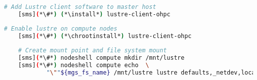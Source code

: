 
\begin{lstlisting}[language=bash,keywords={},upquote=true]
    # Add Lustre client software to master host
    [sms](*\#*) (*\install*) lustre-client-ohpc
    \end{lstlisting}
    
    \begin{lstlisting}[language=bash,keywords={},upquote=true]
    # Enable lustre on compute nodes
    [sms](*\#*) (*\chrootinstall*) lustre-client-ohpc
    
    # Create mount point and file system mount
    [sms](*\#*) nodeshell compute mkdir /mnt/lustre
    [sms](*\#*) nodeshell compute echo  \
            "\""${mgs_fs_name} /mnt/lustre lustre defaults,_netdev,localflock,retry=2 0 0"\"" \>\> /etc/fstab
    \end{lstlisting}
    